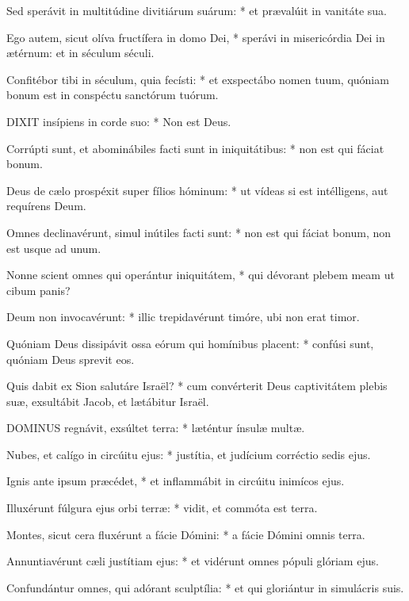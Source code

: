 Sed sperávit in multitúdine divitiárum suárum: * et prævalúit in vanitáte sua.

Ego autem, sicut olíva fructífera in domo Dei, * sperávi in misericórdia Dei in ætérnum: et in séculum séculi.

Confitébor tibi in séculum, quia fecísti: * et exspectábo nomen tuum, quóniam bonum est in conspéctu sanctórum tuórum.


\lettrine[lines=2]{D}{IXIT} insípiens in corde suo: * Non est Deus.

Corrúpti sunt, et abominábiles facti sunt in iniquitátibus: * non est qui fáciat bonum.

Deus de cælo prospéxit super fílios hóminum: * ut vídeas si est intélligens, aut requírens Deum.

Omnes declinavérunt, simul inútiles facti sunt: * non est qui fáciat bonum, non est usque ad unum.

Nonne scient omnes qui operántur iniquitátem, * qui dévorant plebem meam ut cibum panis?

Deum non invocavérunt: * illic trepidavérunt timóre, ubi non erat timor.

Quóniam Deus dissipávit ossa eórum qui homínibus placent: * confúsi sunt, quóniam Deus sprevit eos.

Quis dabit ex Sion salutáre Israël? * cum convérterit Deus captivitátem plebis suæ, exsultábit Jacob, et lætábitur Israël.



\lettrine[lines=2]{D}{OMINUS} regnávit, exsúltet terra: * læténtur ínsulæ multæ.

Nubes, et calígo in circúitu ejus: * justítia, et judícium corréctio sedis ejus.

Ignis ante ipsum præcédet, * et inflammábit in circúitu inimícos ejus.

Illuxérunt fúlgura ejus orbi terræ: * vidit, et commóta est terra.

Montes, sicut cera fluxérunt a fácie Dómini: * a fácie Dómini omnis terra.

Annuntiavérunt cæli justítiam ejus: * et vidérunt omnes pópuli glóriam ejus.

Confundántur omnes, qui adórant sculptília: * et qui gloriántur in simulácris suis.

